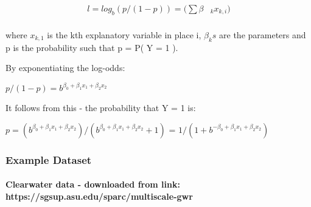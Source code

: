 \documentclass[11pt]{article}
\begin{document}
    \begin{align}
l = log_b ( p / (1-p)) = ({\sum} {\beta} & _k x _{k,i}) \\
\end{align}

where \(x_{k,1}\) is the kth explanatory variable in place i, \(𝛽_ks\)
are the parameters and p is the probability such that p = P( Y = 1 ).

By exponentiating the log-odds:

\(p / (1-p) = b^ {𝛽_0 + 𝛽_1 x_1 + 𝛽_2 x_2}\)

It follows from this - the probability that Y = 1 is:

\(p = (b^ {𝛽_0 + 𝛽_1 x_1 + 𝛽_2 x_2}) / (b^ {𝛽_0 + 𝛽_1 x_1 + 𝛽_2 x_2} + 1)\)
= \(1 / (1 + b^ {- 𝛽_0 + 𝛽_1 x_1 + 𝛽_2 x_2})\)

    \hypertarget{example-dataset}{%
\subsubsection{Example Dataset}\label{example-dataset}}

    \hypertarget{clearwater-data---downloaded-from-link-httpssgsup.asu.edusparcmultiscale-gwr}{%
\paragraph{Clearwater data - downloaded from link:
https://sgsup.asu.edu/sparc/multiscale-gwr}\label{clearwater-data---downloaded-from-link-httpssgsup.asu.edusparcmultiscale-gwr}}
\end{document}
